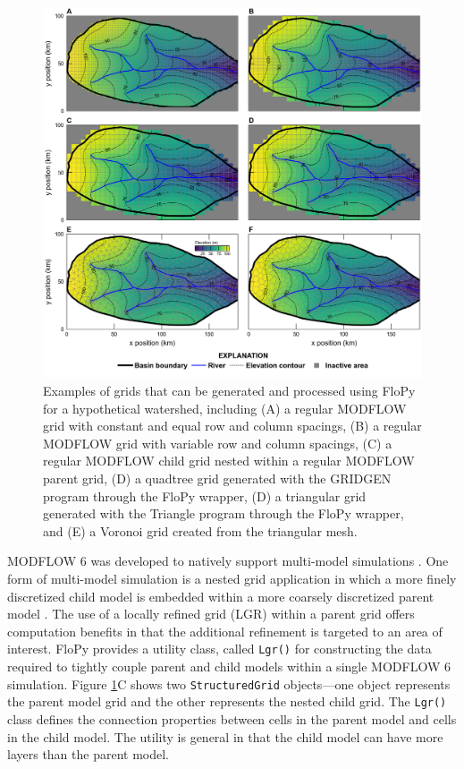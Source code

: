 \documentclass[11pt, oneside]{article}  	%
\begin{document}
\begin{figure}[ht!]
	\begin{center}
		\includegraphics{figures/grids_geoprocessing.png}
	\end{center}
	\caption{Examples of grids that can be generated and processed using FloPy for a hypothetical watershed, including (A) a regular MODFLOW grid with constant and equal row and column spacings, (B) a regular MODFLOW grid with variable row and column spacings, (C) a regular MODFLOW child grid nested within a regular MODFLOW parent grid, (D) a quadtree grid generated with the GRIDGEN program \citep{gridgen} through the FloPy wrapper, (D) a triangular grid generated with the Triangle program \citep{trianglemesh} through the FloPy wrapper, and (E) a Voronoi grid created from the triangular mesh.}\label{fig:grids}
\end{figure}


MODFLOW 6 was developed to natively support multi-model simulations \citep{modflow6framework}. One form of multi-model simulation is a nested grid application in which a more finely discretized child model is embedded within a more coarsely discretized parent model \citep{modflowlgr, vilhelmsen2012evaluation, modflowlgr2}. The use of a locally refined grid (LGR) within a parent grid offers computation benefits in that the additional refinement is targeted to an area of interest. FloPy provides a utility class, called \texttt{Lgr()} for constructing the data required to tightly couple parent and child models within a single MODFLOW 6 simulation.  Figure \ref{fig:grids}C shows two \texttt{StructuredGrid} objects---one object represents the parent model grid and the other represents the nested child grid. The \texttt{Lgr()} class defines the connection properties between cells in the parent model and cells in the child model. The utility is general in that the child model can have more layers than the parent model.
\end{document}
